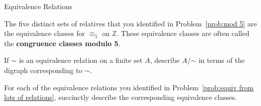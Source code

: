 \begin{section}{Equivalence Relations}
\begin{example}
The five distinct sets of relatives that you identified in Problem~\ref{prob:mod 5} are the equivalence classes for $\equiv_5$ on $\mathbb{Z}$. These equivalence classes are often called the \textbf{congruence classes modulo 5}.
\end{example}

\begin{problem}
If $\sim$ is an equivalence relation on a finite set $A$, describe $A/\mathord\sim$ in terms of the digraph corresponding to $\sim$.
\end{problem}

\begin{problem}
For each of the equivalence relations you identified in Problem~\ref{prob:equiv from lots of relations}, succinctly describe the corresponding equivalence classes.
\end{problem}

\end{section}